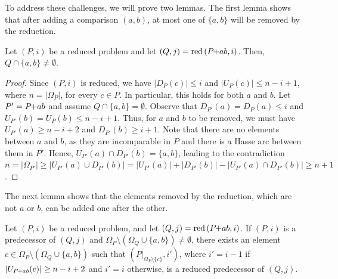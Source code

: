 \documentclass[a4paper,UKenglish,cleveref, autoref, thm-restate]{lipics-v2021}
\newcommand{\pchild}[3]{{#1}\kern-1pt{+}{#2}{#3}}
\newcommand{\reduced}[1]{\operatorname{red}{#1}}
\newcommand{\less}[2]{D_{#1}(#2)}
\newcommand{\greater}[2]{U_{#1}(#2)}
\begin{document}
To address these challenges, we will prove two lemmas.
The first lemma shows that after adding a comparison $(a, b)$, at most one of $\{a, b\}$ will be removed by the reduction.

\begin{lemma} \label{lemma:remove_only_last_element_edge}
  Let $(P, i)$ be a reduced problem and let $(Q, j) = \reduced{(\pchild{P}{a}{b}, i)}$.
  Then, $Q \cap \{a, b\} \neq \emptyset$.
\end{lemma}

\begin{proof}
  Since $(P, i)$ is reduced, we have $|\less{P}{c}| \leq i$ and $|\greater{P}{c}| \leq n - i + 1$, where $n = |\Omega_P|$, for every $c \in P$.
  In particular, this holds for both $a$ and $b$.
  Let $P' = \pchild{P}{a}{b}$ and assume $Q \cap \{a, b\} = \emptyset$.
  Observe that $\less{P'}{a} = \less{P}{a} \leq i$ and $\greater{P'}{b} = \greater{P}{b} \leq n - i + 1$.
  Thus, for $a$ and $b$ to be removed, we must have $\greater{P'}{a} \geq n - i + 2$ and $\less{P'}{b} \geq i + 1$.
  Note that there are no elements between $a$ and $b$, as they are incomparable in $P$ and there is a Hasse arc between them in $P'$.
  Hence, $\greater{P'}{a} \cap \less{P'}{b} = \{a, b\}$, leading to the contradiction $n = |\Omega_{P'}| \ge |\greater{P'}{a} \cup \less{P'}{b}| = |\greater{P'}{a}| + |\less{P'}{b}| - |\greater{P'}{a} \cap \less{P'}{b}| \ge n + 1$.
\end{proof}

The next lemma shows that the elements removed by the reduction, which are not $a$ or $b$, can be added one after the other.

\begin{lemma} \label{lemma:remove_elements_iteratively}
  Let $(P, i)$ be a reduced problem, and let $(Q, j) = \reduced{(\pchild{P}{a}{b}, i)}$.
  If $(P, i)$ is a predecessor of $(Q, j)$ and $\Omega_P \setminus (\Omega_Q \cup \{a, b\}) \neq \emptyset$, there exists an element $c \in \Omega_P \setminus (\Omega_Q \cup \{a, b\})$ such that $(P|_{\Omega_P \setminus \{c\}}, i')$, where $i' = i - 1$ if $|\greater{\pchild{P}{a}{b}}{c}| \ge n - i + 2$ and $i' = i$ otherwise, is a reduced predecessor of $(Q, j)$.
\end{lemma}
\end{document}

